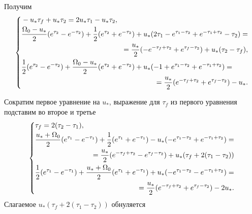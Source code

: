 \documentclass[a4paper,14pt]{article}
\theoremstyle{plain} %
\theoremstyle{definition} %
\theoremstyle{remark} %
\begin{document}
{\[\]
Получим
\[
    \left\{
    \begin{multlined}
        -u_*\tau_f+u_*\tau_2=2u_*\tau_1-u_*\tau_2, \\
        \shoveleft{ \frac{\Omega_0-u_*}{2}(e^{\tau_2}-e^{-\tau_2})+\frac{1}{2}(e^{\tau_2}+e^{-\tau_2})+u_*(2\tau_1-e^{\tau_1-\tau_2}+e^{-\tau_1+\tau_2}-\tau_2)=} \\
        \shoveright{=\frac{u_*}{2}(-e^{-\tau_f+\tau_2}+e^{\tau_f-\tau_2})+u_*(\tau_2-\tau_f),} \\
        \shoveleft{\frac{1}{2}(e^{\tau_2}-e^{-\tau_2})+\frac{\Omega_0-u_*}{2}(e^{\tau_2}+e^{-\tau_2})+u_*(-1+e^{\tau_1-\tau_2}+e^{-\tau_1+\tau_2})=} \\
        =\frac{u_*}{2}(e^{-\tau_f+\tau_2}+e^{\tau_f-\tau_2})-u_*.
    \end{multlined}
    \right.
\]

Сократим первое уравнение на $u_*$, выражение для $\tau_f$ из первого уравнения подставим во второе и третье
\[
    \left\{
    \begin{multlined}
        \tau_f=2(\tau_2-\tau_1), \\
        \shoveleft{\frac{u_*+\Omega_0}{2}(e^{\tau_1}-e^{-\tau_1})+\frac{1}{2}(e^{\tau_1}+e^{-\tau_1})-u_*(-e^{\tau_1-\tau_2}+e^{-\tau_1+\tau_2})=} \\
        \shoveright{=\frac{u_*}{2}(e^{-\tau_f+\tau_2}-e^{\tau_f-\tau_2})+u_*(\tau_f+2(\tau_1-\tau_2))} \\
        \shoveleft{\frac{1}{2}(e^{\tau_1}-e^{-\tau_1})+\frac{u_*+\Omega_0}{2}(e^{\tau_1}+e^{-\tau_1})+u_*(-e^{\tau_1-\tau_2}-e^{-\tau_1+\tau_2})=} \\
        =\frac{u_*}{2}(e^{-\tau_f+\tau_2}+e^{\tau_f-\tau_2})-2u_*.
    \end{multlined}
    \right.
\]
Слагаемое $u_*(\tau_f+2(\tau_1-\tau_2))$ обнуляется

}
\end{document}
